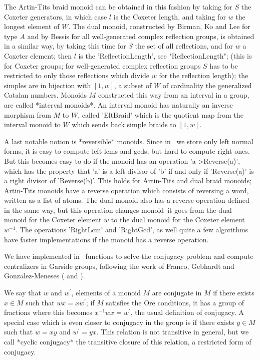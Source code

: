 The  Artin-Tits braid monoid can be obtained  in this fashion by taking for
$S$  the Coxeter generators, in  which case $l$ is  the Coxeter length, and
taking  for $w$ the longest element of $W$. The dual monoid, constructed by
Birman,  Ko  and  Lee  for  type  $A$  and by Bessis for all well-generated
complex  reflection groups,  is obtained  in a  similar way, by taking this
time  for $S$ the  set of all  reflections, and for  $w$ a Coxeter element;
then  $l$ is the  'ReflectionLength', see "ReflectionLength";  (this is for
Coxeter  groups; for well-generated complex reflection groups $S$ has to be
restricted  to only those  reflections which divide  $w$ for the reflection
length);  the simples  are in  bijection with  $[1,w]$, a  subset of $W$ of
cardinality  the generalized Catalan numbers.  Monoids $M$ constructed this
way from an interval in a group, are called *interval monoids*. An interval
monoid has naturally an inverse morphism from $M$ to $W$, called 'EltBraid'
which  is the quotient map from the interval monoid to $W$ which sends back
simple braids to $[1,w]$.

A  last notable notion is *reversible*  monoids. Since in \CHEVIE\ we store
only  left normal forms, it is easy to compute left lcms and gcds, but hard
to  compute right ones.  But this becomes  easy to do  if the monoid has an
operation  'a->Reverse(a)',  which  has  the  property  that  'a' is a left
divisor  of  'b'  if  and  only  if  'Reverse(a)'  is  a  right  divisor of
'Reverse(b)'.  This holds for Artin-Tits and dual braid monoids; Artin-Tits
monoids  have  a  reverse  operation  which  consists  of reversing a word,
written  as a list of  atoms. The dual monoid  also has a reverse operation
defined  in the same way, but this operation changes monoid\:\ it goes from
the  dual monoid  for the  Coxeter element  $w$ to  the dual monoid for the
Coxeter element $w^{-1}$. The operations 'RightLcm' and 'RightGcd', as well
quite  a few  algorithms have  faster implementations  if the  monoid has a
reverse operation.

We  have implemented in  \CHEVIE\ functions to  solve the conjugacy problem
and  compute centralizers in Garside groups,  following the work of Franco,
Gebhardt and Gonzalez-Meneses (\cite{gebgon10} and \cite{fragon03}).

We  say that $w$ and $w^\prime$, elements  of a monoid $M$ are conjugate in
$M$ if there exists $x\in M$ such that $wx=xw^\prime$; if $M$ satisfies the
{ O}re conditions, it has a group of fractions where this becomes
$x^{-1}wx=w^\prime$,  the  usual  definition  of  conjugacy. A special case
which  is even closer to conjugacy in the group is if there exists $y\in M$
such  that $w=xy$  and $w^\prime=yx$.  This relation  is not  transitive in
general,  but we  call *cyclic  conjugacy* the  transitive closure  of this
relation, a restricted form of conjugacy.


